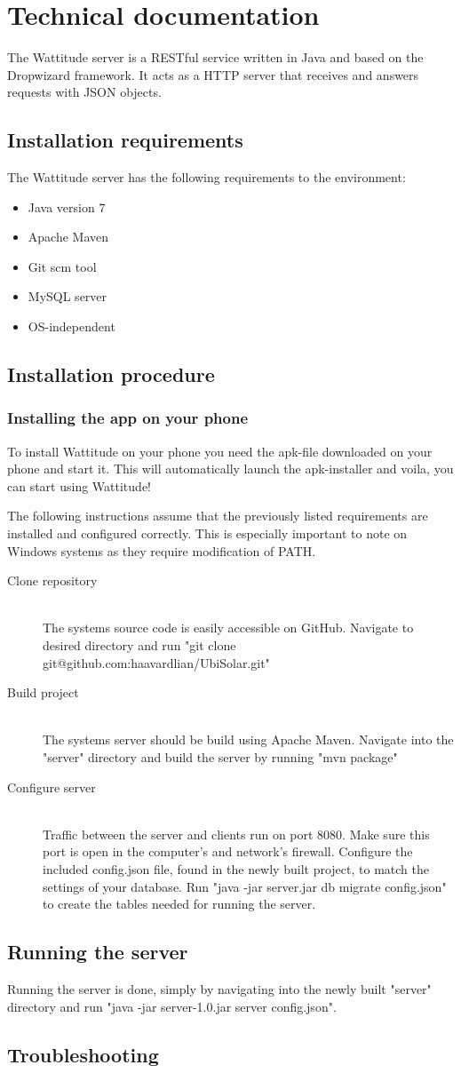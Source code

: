 \chapter{Technical documentation}
The Wattitude server is a RESTful service written in Java and based on the Dropwizard framework. It acts as a HTTP server that receives and answers requests with JSON objects. 
\section{Installation requirements}
The Wattitude server has the following requirements to the environment:
\begin{itemize}
\item Java version 7
\item Apache Maven 
\item Git scm tool
\item MySQL server
\item OS-independent
\end{itemize}
\section{Installation procedure}

\subsection{Installing the app on your phone}
To install Wattitude on your phone you need the apk-file downloaded on your phone and start it. This will automatically launch the apk-installer and voila, you can start using Wattitude!

The following instructions assume that the previously listed requirements are installed and configured correctly. This is especially important to note on Windows systems as they require modification of PATH.
\begin{description}
  \item[Clone repository] \hfill \\
  The systems source code is easily accessible on GitHub. Navigate to desired directory and run "git clone git@github.com:haavardlian/UbiSolar.git"
  \item[Build project] \hfill \\
  The systems server should be build using Apache Maven. Navigate into the "server" directory and build the server by running "mvn package"
  \item[Configure server] \hfill \\
  Traffic between the server and clients run on port 8080. Make sure this port is open in the computer's and network's firewall. Configure the included config.json file, found in the newly built project, to match the settings of your database. Run "java -jar server.jar db migrate config.json" to create the tables needed for running the server. 
  
\end{description}

\section{Running the server}
Running the server is done, simply by navigating into the newly built "server" directory and run "java -jar server-1.0.jar server config.json".

\section{Troubleshooting}